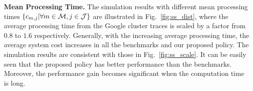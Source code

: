 \noindent\textbf{Mean Processing Time.}
The simulation results with different mean processing times $\{c_{m,j}|\forall m\in\mathcal{M},j\in\mathcal{J}\}$ are illustrated in Fig.~\ref{fig:ss_dist}, where the average processing time from the Google cluster traces is scaled by a factor from $0.8$ to $1.6$ respectively.
Generally, with the increasing average processing time, the average system cost increases in all the benchmarks and our proposed policy.
The simulation results are consistent with those in Fig.~\ref{fig:ss_scale}.
It can be easily seen that the proposed policy has better performance than the benchmarks.
Moreover, the performance gain becomes significant when the computation time is long.
